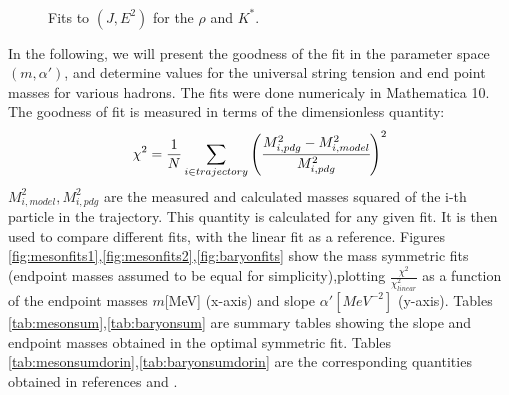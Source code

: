 \documentclass[11pt,a4paper]{article}
\begin{document}
\begin{figure}[h]
\centering
	~
	\caption{Fits to $\left(J,E^{2}\right)$ for the $\rho$ and $K^{*}$.}
	\label{fig:jfit}  
\end{figure}
 
In the following, we will present the goodness of the fit in the parameter space $\left(m,\alpha'\right)$, and determine values for the universal string tension and end point masses for various hadrons. The fits were done numericaly in Mathematica 10. The goodness of fit is measured in terms of the dimensionless quantity:
\begin{equation}
\label{eq:chisq}
\chi^{2}=\frac{1}{N}\sum_{i\in trajectory}\left(\cfrac{M_{i,pdg}^{2}-M_{i,model}^{2}}{M_{i,pdg}^{2}}\right)^{2}
\end{equation}
$M_{i,model}^{2},M_{i,pdg}^{2}$ are the measured and calculated masses squared of the i-th particle in the trajectory. This quantity is calculated for any given fit. It is then used to compare different fits, with the linear fit as a reference. Figures \ref{fig:mesonfits1},\ref{fig:mesonfits2},\ref{fig:baryonfits} show the mass symmetric fits (endpoint masses assumed to be equal for simplicity),plotting $\frac{\chi^{2}}{\chi_{linear}^{2}}$ as a function of the endpoint masses $m$[MeV] (x-axis) and slope $\alpha'[MeV^{-2}]$ (y-axis). Tables \ref{tab:mesonsum},\ref{tab:baryonsum} are summary tables showing the slope and endpoint masses obtained in the optimal symmetric fit. Tables \ref{tab:mesonsumdorin},\ref{tab:baryonsumdorin} are the corresponding quantities obtained in references \cite{Sonnenschein14} and \cite{Sonnenschein15}.
\end{document}
